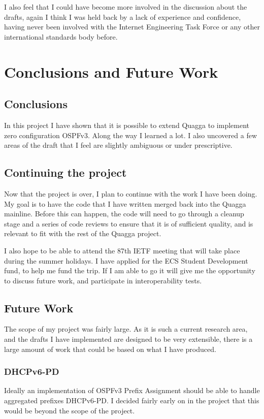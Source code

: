 \documentclass[12pt]{report}
\begin{document}
I also feel that I could have become more involved in the discussion about the
drafts, again I think I was held back by a lack of experience and confidence,
having never been involved with the Internet Engineering Task Force or any
other international standards body before. 
 
\chapter{Conclusions and Future Work}

\section{Conclusions}
In this project I have shown that it is possible to extend Quagga to implement
zero configuration OSPFv3. Along the way I learned a lot. I also uncovered a
few areas of the draft that I feel are slightly ambiguous or under
prescriptive. 

\section{Continuing the project}
Now that the project is over, I plan to continue with the work I have been
doing.  My goal is to have the code that I have written merged back into the
Quagga mainline. Before this can happen, the code will need to go through a
cleanup stage and a series of code reviews to ensure that it is of sufficient
quality, and is relevant to fit with the rest of the Quagga project.

I also hope to be able to attend the 87th IETF meeting that will take place
during the summer holidays. I have applied for the ECS Student Development
fund, to help me fund the trip. If I am able to go it will give me the
opportunity to discuss future work, and participate in interoperability tests.

\section{Future Work}
The scope of my project was fairly large. As it is such a current research
area, and the drafts I have implemented are designed to be very extensible,
there is a large amount of work that could be based on what I have produced. 

\subsection{DHCPv6-PD}
Ideally an implementation of OSPFv3 Prefix Assignment should be able to handle
aggregated prefixes DHCPv6-PD\@. I decided fairly early on in the project that
this would be beyond the scope of the project. 
\end{document}
